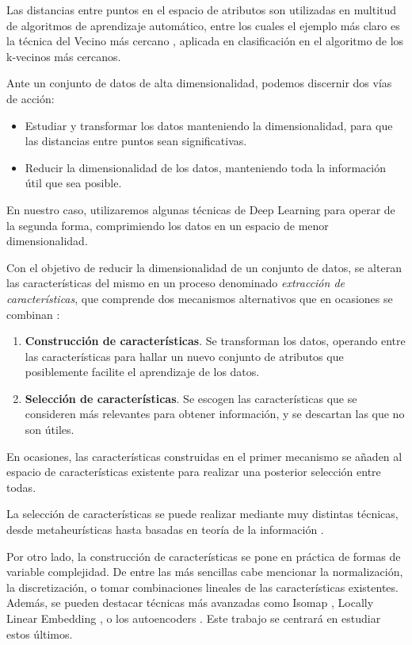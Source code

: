 Las distancias entre puntos en el espacio de atributos son utilizadas en
multitud de algoritmos de aprendizaje automático, entre los cuales el
ejemplo más claro es la técnica del Vecino más cercano
\autocite{peterson2009}, aplicada en clasificación en el algoritmo de los k-vecinos más cercanos.

Ante un conjunto de datos de alta
dimensionalidad, podemos discernir dos vías de acción:
\begin{itemize}
\tightlist
\item
  Estudiar y transformar los datos manteniendo la dimensionalidad, para
  que las distancias entre puntos sean significativas.
\item
  Reducir la dimensionalidad de los datos, manteniendo toda la
  información útil que sea posible.
\end{itemize}
En nuestro caso, utilizaremos algunas técnicas de Deep Learning para
operar de la segunda forma, comprimiendo los datos en un espacio de
menor dimensionalidad.

Con el objetivo de reducir la dimensionalidad de un conjunto de datos,
se alteran las características del mismo en un proceso denominado
\emph{extracción de características}, que comprende dos mecanismos alternativos que en ocasiones se combinan
\autocite{guyon2006}:

\begin{enumerate}
\def\labelenumi{\arabic{enumi}.}
\tightlist
\item
  \textbf{Construcción de características}. Se transforman los datos,
  operando entre las características para hallar un nuevo conjunto de
  atributos que posiblemente facilite el aprendizaje de los datos.
\item
  \textbf{Selección de características}. Se escogen las características
  que se consideren más relevantes para obtener información, y se
  descartan las que no son útiles.
\end{enumerate}

En ocasiones, las características construidas en el primer mecanismo se añaden al espacio de características existente para realizar una posterior selección entre todas.

La selección de características se puede realizar mediante muy distintas
técnicas, desde metaheurísticas hasta basadas en teoría de la
información \autocite{molina2002}.

Por otro lado, la construcción de características se pone en práctica de
formas de variable complejidad. De entre las más sencillas cabe
mencionar la normalización, la discretización, o tomar combinaciones
lineales de las características existentes. Además, se pueden destacar
técnicas más avanzadas como Isomap \autocite{tenenbaum2000}, Locally
Linear Embedding \autocite{roweis2000}, o los autoencoders
\autocite{hinton2006autoencoder}. Este trabajo se centrará en estudiar
estos últimos.

